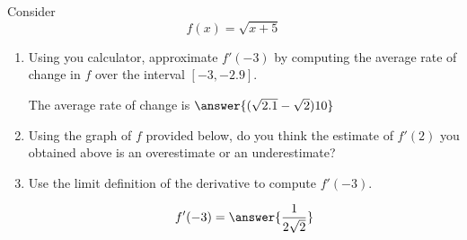 \documentclass{ximera}
\author{Steven Gubkin}
\begin{document}
\begin{exercise}



Consider 
\[
f(x) = \sqrt{x+5}
\]

\begin{enumerate}
\item Using you calculator, approximate $f'(-3)$ by computing the average rate of change in $f$ over the interval $[-3,-2.9]$. \begin{prompt}   The average rate of change is  $\answer{(\sqrt{2.1}-\sqrt{2})10}$ \end{prompt}
\item Using the graph of $f$ provided below, do you think the estimate of $f'(2)$ you obtained above is an overestimate or an underestimate?

\begin{prompt}
\begin{multipleChoice}
\end{multipleChoice}
\end{prompt}

\begin{image}
\end{image}

\item Use the limit definition of the derivative to compute $f'(-3)$.  \begin{prompt}$$f'(-3) = \answer{\frac{1}{2\sqrt{2}}}$$\end{prompt}
\end{enumerate}
\end{exercise}
\end{document}

